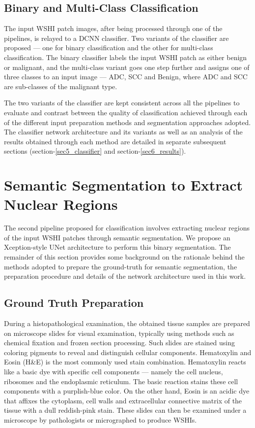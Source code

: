 \documentclass{comjnl}
\begin{document}
\subsection{Binary and Multi-Class Classification}

The input WSHI patch images, after being processed through one of the pipelines, is relayed to a DCNN classifier. Two variants of the classifier are proposed --- one for binary classification and the other for multi-class classification. The binary classifier labels the input WSHI patch as either benign or malignant, and the multi-class variant goes one step further and assigns one of three classes to an input image --- ADC, SCC and Benign, where ADC and SCC are sub-classes of the malignant type.

The two variants of the classifier are kept consistent across all the pipelines to evaluate and contrast between the quality of classification achieved through each of the different input preparation methods and segmentation approaches adopted. The classifier network architecture and its variants as well as an analysis of the results obtained through each method are detailed in separate subsequent sections (section-\ref{sec5_classifier} and section-\ref{sec6_results}).

\section{Semantic Segmentation to Extract Nuclear Regions}
\label{sec4_segmentation}
The second pipeline proposed for classification involves extracting nuclear regions of the input WSHI patches through semantic segmentation. We propose an Xception-style UNet architecture to perform this binary segmentation. The remainder of this section provides some background on the rationale behind the methods adopted to prepare the ground-truth for semantic segmentation, the preparation procedure and details of the network architecture used in this work.

\subsection{Ground Truth Preparation}

During a histopathological examination, the obtained tissue samples are prepared on microscope slides for visual examination, typically using methods such as chemical fixation and frozen section processing. Such slides are stained using coloring pigments to reveal and distinguish cellular components. Hematoxylin and Eosin (H\&E) is the most commonly used stain combination. Hematoxylin reacts like a basic dye with specific cell components --- namely the cell nucleus, ribosomes and the endoplasmic reticulum. The basic reaction stains these cell components with a purplish-blue color. On the other hand, Eosin is an acidic dye that affixes the cytoplasm, cell walls and extracellular connective matrix of the tissue with a dull reddish-pink stain. These slides can then be examined under a microscope by pathologists or micrographed to produce WSHIs. 
\end{document}
